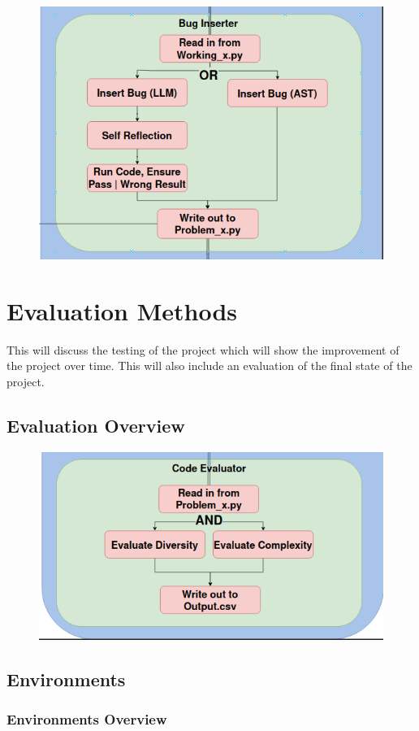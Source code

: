 \documentclass[12pt]{extarticle}
\begin{document}
\begin{figure}[H]
\centering
\includegraphics[width=0.7\linewidth]{Images/Bug_Inserter.png}
\label{fig:bug_inserter}
\end{figure}

\newpage
\section{Evaluation Methods}

This will discuss the testing of the project which will show the improvement of the project over time. This will also include an evaluation of the final state of the project.

\subsection{Evaluation Overview}

\begin{figure}[H]
\centering
\includegraphics[width=0.7\linewidth]{Images/Code_Evaluator.png}
\label{fig:code_evaluator}
\end{figure}

\subsection{Environments}

\subsubsection{Environments Overview}
\end{document}
